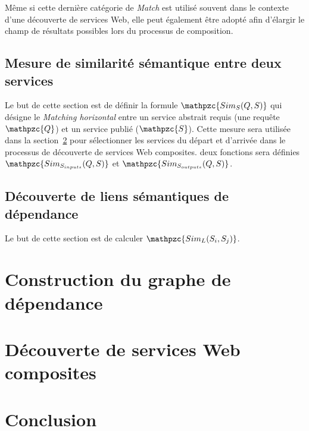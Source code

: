 Même si cette dernière catégorie de \emph{Match} est utilisé souvent
dans le contexte d'une découverte de services Web, elle peut également
être adopté afin d'élargir le champ de résultats possibles lors du
processus de composition.


\subsection{Mesure de similarité sémantique entre deux services}
\label{sec:matching-sims}

Le but de cette section est de définir la formule {\large
  $\mathpzc{Sim_S(Q,S)}$} qui désigne le \emph{Matching horizontal}
entre un service abstrait requis (une requête $\mathpzc{Q}$) et un
service publié ($\mathpzc{S}$). Cette mesure sera utilisée dans la
section~\ref{sec:ch3/composition} pour sélectionner les services du
départ et d'arrivée dans le processus de découverte de services Web
composites. deux fonctions sera définies {\large
  $\mathpzc{Sim_{S_{inputs}}(Q,S)}$} et {\large
  $\mathpzc{Sim_{S_{outputs}}(Q,S)}$}.


\newpage
\subsection{Découverte de liens sémantiques de dépendance}
\label{sec:matching-siml}

Le but de cette section est de calculer {\large
  $\mathpzc{Sim_L(S_i, S_j)}$}.

\newpage
\section{Construction du graphe de dépendance}
\label{sec:ch3/graph}

\section{Découverte de services Web composites}
\label{sec:ch3/composition}

\section*{Conclusion}
\label{sec:ch3/conclusion}
 


